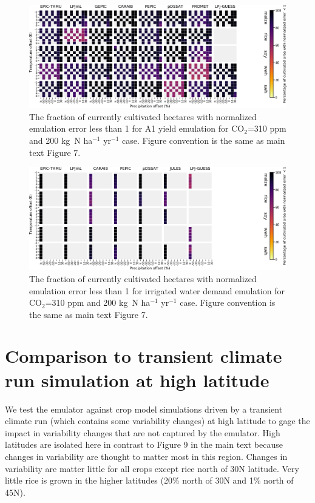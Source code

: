 \documentclass[12pt]{article}
\begin{document}
\begin{figure}[h!]
  \centering
  \includegraphics[width=15.5cm]{error_grid_360_cultivated_A1.png}
  \caption{
  The fraction of currently cultivated hectares with normalized emulation error less than 1 for A1 yield emulation for CO$_2$=310 ppm and 200 kg~N ha$^{-1}$ yr$^{-1}$ case. Figure convention is the same as main text Figure 7.
  }
  \label{fig:error810}
\end{figure}

\begin{figure}[h!]
  \centering
  \includegraphics[width=15.5cm]{error_grid_360_cultivated_IWD.png}
  \caption{
  The fraction of currently cultivated hectares with normalized emulation error less than 1 for irrigated water demand emulation for CO$_2$=310 ppm and 200 kg~N ha$^{-1}$ yr$^{-1}$ case. Figure convention is the same as main text Figure 7.
  }
  \label{fig:error810}
\end{figure}

\clearpage
\section{Comparison to transient climate run simulation at high latitude}
\begin{flushleft}
We test the emulator against crop model simulations driven by a transient climate run (which contains some variability changes) at high latitude to gage the impact in variability changes that are not captured by the emulator. 
High latitudes are isolated here in contrast to Figure 9 in the main text because changes in variability are thought to matter most in this region.
Changes in variability are matter little for all crops except rice north of 30N latitude. Very little rice is grown in the higher latitudes (20\% north of 30N and 1\% north of 45N).
\end{flushleft}
\end{document}
